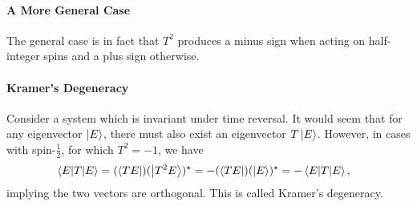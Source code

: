 \paragraph{A More General Case}
The general case is in fact that $T^{2}$ produces a minus sign when acting on half-integer spins and a plus sign otherwise.

\paragraph{Kramer's Degeneracy}
Consider a system which is invariant under time reversal. It would seem that for any eigenvector $\ket{E}$, there must also exist an eigenvector $T\ket{E}$. However, in cases with spin-$\frac{1}{2}$, for which $T^{2} = -1$, we have
\begin{align*}
	\mel{E}{T}{E} &= (\bra{TE})(\ket{T^{2}E})^{\star} = -(\bra{TE})(\ket{E})^{\star} = -\mel{E}{T}{E},
\end{align*}
implying the two vectors are orthogonal. This is called Kramer's degeneracy.